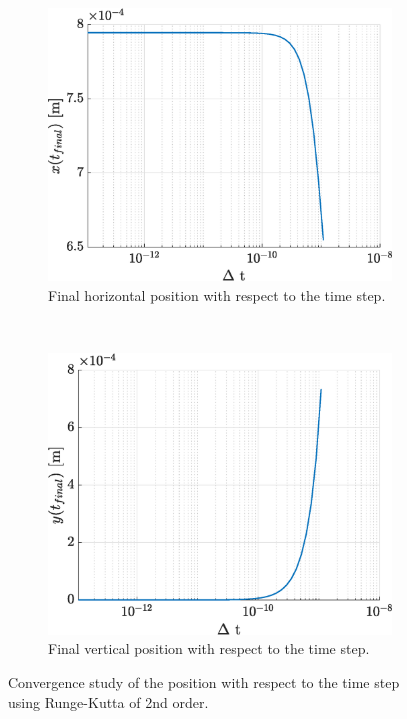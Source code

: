 \documentclass[a4paper,12pt,twoside]{article}
\begin{document}
\begin{figure}[h]
\centering
\begin{subfigure}[t]{0.45\textwidth}
	\includegraphics[width=\textwidth]{graphs/app1_i_conv_x.eps}
	\caption{Final horizontal position with respect to the time step.}
	\label{fig:app1-i-conv-x}
\end{subfigure}
~
\begin{subfigure}[t]{0.45\textwidth}
	\includegraphics[width=\textwidth]{graphs/app1_i_conv_y.eps}
	\caption{Final vertical position with respect to the time step.}
	\label{fig:app1-i-conv-y}
\end{subfigure}
\caption{Convergence study of the position with respect to the time step using Runge-Kutta of 2nd order.}
\label{fig:app1-i-conv}
\end{figure}
\end{document}

